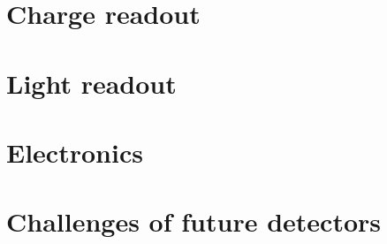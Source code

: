 \section{Charge readout\label{sec:lartpc_readout}}


\section{Light readout\label{sec:lartpc_light}}


\section{Electronics\label{sec:lartpc_electronics}}


\section{Challenges of future detectors\label{sec:lartpc_challenges}}